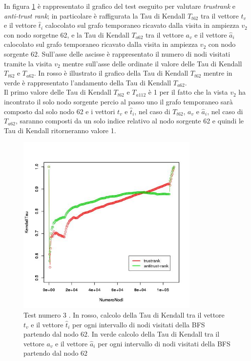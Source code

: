 In figura \ref{fig:test3coplotTrustAntiModeB62} è rappresentato il grafico del test eseguito per valutare \textit{trustrank} e \textit{anti-trust rank}; in particolare è raffigurata la Tau di Kendall \(T_{t62}\) tra il vettore \(t_v\) e il vettore \(\hat{t}_i\) calocolato sul grafo temporaneo ricavato dalla visita in ampiezza \(v_2\) con nodo sorgetne 62, e la Tau di Kendall \(T_{a62}\) tra il vettore \(a_v\) e il vettore \(\hat{a}_i\) calocolato sul grafo temporaneo ricavato dalla visita in ampiezza \(v_2\) con nodo sorgente 62. Sull'asse delle ascisse è rappresentato il numero di nodi visitati tramite la visita \(v_2\) mentre sull'asse delle ordinate il valore delle Tau di Kendall \(T_{t62}\) e \(T_{a62}\). In rosso è illustrato il grafico della Tau di Kendall \(T_{t62}\)  mentre in verde è rappresentato l'andamento della Tau di Kendall \(T_{a62}\).\\ Il primo valore delle Tau di Kendall \(T_{t62}\) e \(T_{a112}\) è 1 per il fatto che la vista \(v_2\) ha incontrato il solo nodo sorgente percio al passo uno il grafo temporaneo sarà composto dal solo nodo 62 e i vettori \(t_v\) e \(\hat{t}_i\), nel caso di \(T_{t62}\), \(a_v\) e \(\hat{a}_i\), nel caso di \(T_{a62}\), saranno composti da un solo indice relativo al nodo sorgente 62 e quindi le Tau di Kendall ritorneranno valore 1.
\begin{figure}
\centering
 \includegraphics[height=9cm]{immagini/test3/coplotTrustAnti_Mode1_set3776_62}
 \caption{Test numero 3 . In rosso, calcolo della Tau di Kendall  tra il vettore $t_v$ e il vettore $\hat{t}_i$ per ogni intervallo di nodi visitati della BFS partendo dal nodo 62. In verde calcolo della Tau di Kendall tra il vettore $a_v$ e il vettore $\hat{a}_i$ per ogni intervallo di nodi visitati della BFS partendo dal nodo 62}
 \label{fig:test3coplotTrustAntiModeB62}
\end{figure}
